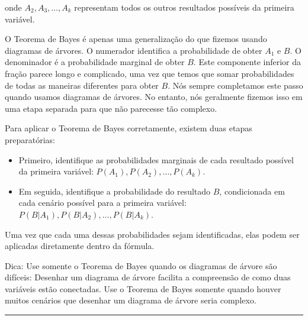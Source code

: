 \documentclass[
]{book}
\theoremstyle{definition}
\theoremstyle{definition}
\theoremstyle{definition}
\theoremstyle{definition}
\theoremstyle{remark}
\begin{document}
onde \(A_2, A_3, \dots, A_k\) representam todos os outros resultados possíveis da primeira variável.

O Teorema de Bayes é apenas uma generalização do que fizemos usando diagramas de árvores. O numerador identifica a probabilidade de obter \(A_1\) e \(B\). O denominador é a probabilidade marginal de obter \(B\). Este componente inferior da fração parece longo e complicado, uma vez que temos que somar probabilidades de todas as maneiras diferentes para obter \(B\). Nós sempre completamos este passo quando usamos diagramas de árvores. No entanto, nós geralmente fizemos isso em uma etapa separada para que não parecesse tão complexo.

Para aplicar o Teorema de Bayes corretamente, existem duas etapas preparatórias:

\begin{itemize}
\item
  Primeiro, identifique as probabilidades marginais de cada resultado possível da primeira variável: \(P(A_1), P(A_2), \dots, P(A_k)\).
\item
  Em seguida, identifique a probabilidade do resultado \(B\), condicionada em cada cenário possível para a primeira variável: \(P(B | A_1), P(B | A_2), \dots, P(B | A_k)\).
\end{itemize}

Uma vez que cada uma dessas probabilidades sejam identificadas, elas podem ser aplicadas diretamente dentro da fórmula.

Dica: Use somente o Teorema de Bayes quando os diagramas de árvore são difíceis: Desenhar um diagrama de árvore facilita a compreensão de como duas variáveis estão conectadas. Use o Teorema de Bayes somente quando houver muitos cenários que desenhar um diagrama de árvore seria complexo.

\begin{center}\rule{0.5\linewidth}{0.5pt}\end{center}
\end{document}
